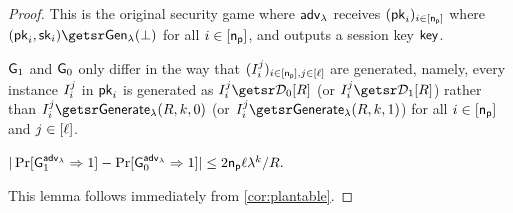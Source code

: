 \begin{proof}

 This is the original security game where ${\mathsf{adv}}_\lambda$ receives $(\mathsf{pk}_i)_{i\in[\mathsf{n_p}]}$ where $(\pk_i,\sk_i)\getsr\Gen(\bot)$ for all $i \in [\mathsf{n_p}]$, and outputs a session key $\mathsf{key}$.

 $\mathsf{G}_1$ and $\mathsf{G}_0$ only differ in the way that $(I_i^j)_{i \in [\mathsf{n_p}], j \in [\ell]}$ are generated, namely, every instance $I_i^j$ in $\mathsf{pk}_i$ is generated as $\instance_i^j \getsr \zkcdistzero{R}$ (or $\instance_i^j \getsr \zkcdistone{R}$) rather than $\instance_i^j \getsr \Generate(R, k, 0)$ (or $\instance_i^j \getsr \Generate(R, k, 1)$) for all $i \in [\mathsf{n_p}]$ and $j \in [\ell]$.
\begin{lemma}
\label{lem:timenike-0}
$|\Pr[\mathsf{G}_1^{{\mathsf{adv}}_\lambda}\Rightarrow 1]-\Pr[\mathsf{G}_0^{{\mathsf{adv}}_\lambda}\Rightarrow 1]| \leq 2\mathsf{n_p}\ell\lambda^{k}/{R}.$
\end{lemma}
This lemma follows immediately from \cref{cor:plantable}.
%
%


\end{proof}
